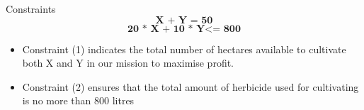 \documentclass{beamer}
\begin{document}
\begin{frame}{Constraints}
\begin{equation}\label{1}
    \textbf{X + Y = 50}            
\end{equation} 
\begin{equation} 
   \textbf{20 * X + 10 * Y} <\textbf{= 800}
\end{equation}

\begin{itemize}
\item Constraint (1) indicates the total number of hectares available to cultivate both X and Y in our mission to maximise profit.
\item Constraint (2) ensures that the total amount of herbicide used for cultivating is no more than 800 litres
\end{itemize}
\end{frame}
\end{document}
